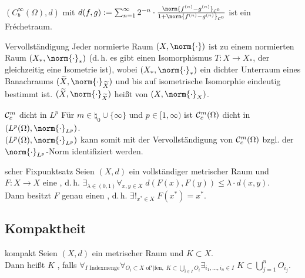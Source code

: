\linie

\begin{Bsp}
    $(C^\infty_b(\Omega), d)$ mit $d(f, g) := \sum_{n=1}^\infty 2^{-n} \cdot
    \frac{\norm{f^{(n)} - g^{(n)}}_{\C^0}}{1 + \norm{f^{(n)} - g^{(n)}}_{\C^0}}$
    ist ein Fréchetraum.
\end{Bsp}

\begin{Satz}{Vervollständigung}
    Jeder normierte Raum $(X, \norm{\cdot})$ ist  zu einem
    normierten Raum $(X_\ast, \norm{\cdot}_\ast)$
    (d.\,h. es gibt einen Isomorphismus $T\colon X \rightarrow X_\ast$, der gleichzeitig
    eine Isometrie ist),
    wobei $(X_\ast, \norm{\cdot}_\ast)$ ein dichter Unterraum eines Banachraums
    $(\widetilde{X}, \norm{\cdot}_{\widetilde{X}})$ und
    bis auf isometrische Isomorphie eindeutig bestimmt ist.
    $(\widetilde{X}, \norm{\cdot}_{\widetilde{X}})$
    heißt  von $(X, \norm{\cdot}_X)$.
\end{Satz}

\begin{Satz}{$\mathcal{C}^m_c$ dicht in $L^p$}
    Für $m \in \natural_0 \cup \{\infty\}$ und $p \in [1, \infty)$ ist
    $\mathcal{C}^m_c(\Omega)$ dicht in $(L^p(\Omega), \norm{\cdot}_{L^p})$.\\
    $(L^p(\Omega), \norm{\cdot}_{L^p})$ kann somit mit der Vervollständigung von $\mathcal{C}^m_c(\Omega)$
    bzgl. der $\norm{\cdot}_{L^p}$-Norm identifiziert werden.
\end{Satz}

\linie

\begin{Satz}{scher Fixpunktsatz}
    Seien $(X, d)$ ein vollständiger metrischer Raum und\\
    $F\colon X \rightarrow X$ eine , d.\,h.
    $\exists_{\lambda \in (0, 1)} \forall_{x, y \in X}\;
    d(F(x), F(y)) \le \lambda \cdot d(x, y)$.\\
    Dann besitzt $F$ genau einen ,
    d.\,h. $\exists!_{x^\ast \in X}\; F(x^\ast) = x^\ast$.
\end{Satz}

\subsection{%
    Kompaktheit%
}

\begin{Def}{kompakt}
    Seien $(X, d)$ ein metrischer Raum und $K \subset X$.\\
    Dann heißt $K$ , falls
    $\forall_{I \text{ Indexmenge}} \forall_{O_i \subset X \text{ of"|fen},\;
    K \subset \bigcup_{i \in I} O_i} \exists_{i_1, \dotsc, i_n \in I}\;
    K \subset \bigcup_{j=1}^n O_{i_j}$.
\end{Def}


